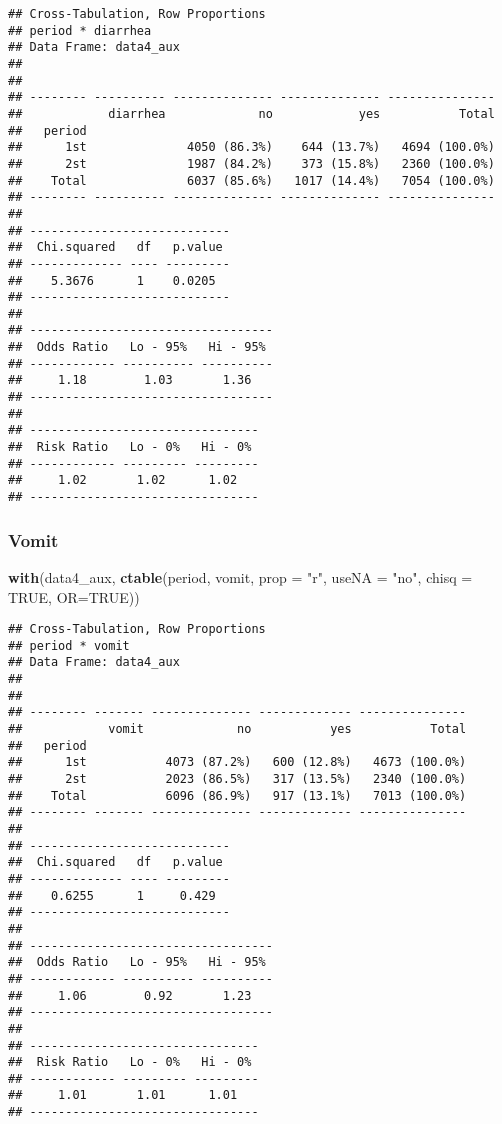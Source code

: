 \documentclass[
]{article}
\newenvironment{Shaded}{\begin{snugshade}}{\end{snugshade}}
\newcommand{\DataTypeTok}[1]{\textcolor[rgb]{0.13,0.29,0.53}{#1}}
\newcommand{\KeywordTok}[1]{\textcolor[rgb]{0.13,0.29,0.53}{\textbf{#1}}}
\newcommand{\NormalTok}[1]{#1}
\newcommand{\OtherTok}[1]{\textcolor[rgb]{0.56,0.35,0.01}{#1}}
\newcommand{\StringTok}[1]{\textcolor[rgb]{0.31,0.60,0.02}{#1}}
\begin{document}
\begin{verbatim}
## Cross-Tabulation, Row Proportions  
## period * diarrhea  
## Data Frame: data4_aux  
## 
## 
## -------- ---------- -------------- -------------- ---------------
##            diarrhea             no            yes           Total
##   period                                                         
##      1st              4050 (86.3%)    644 (13.7%)   4694 (100.0%)
##      2st              1987 (84.2%)    373 (15.8%)   2360 (100.0%)
##    Total              6037 (85.6%)   1017 (14.4%)   7054 (100.0%)
## -------- ---------- -------------- -------------- ---------------
## 
## ----------------------------
##  Chi.squared   df   p.value 
## ------------- ---- ---------
##    5.3676      1    0.0205  
## ----------------------------
## 
## ----------------------------------
##  Odds Ratio   Lo - 95%   Hi - 95% 
## ------------ ---------- ----------
##     1.18        1.03       1.36   
## ----------------------------------
## 
## --------------------------------
##  Risk Ratio   Lo - 0%   Hi - 0% 
## ------------ --------- ---------
##     1.02       1.02      1.02   
## --------------------------------
\end{verbatim}

\hypertarget{vomit-2}{%
\subsubsection{Vomit}\label{vomit-2}}

\begin{Shaded}
\begin{Highlighting}[]
\KeywordTok{with}\NormalTok{(data4_aux, }\KeywordTok{ctable}\NormalTok{(period, vomit, }\DataTypeTok{prop =} \StringTok{"r"}\NormalTok{, }\DataTypeTok{useNA =} \StringTok{"no"}\NormalTok{, }\DataTypeTok{chisq =} \OtherTok{TRUE}\NormalTok{, }\DataTypeTok{OR=}\OtherTok{TRUE}\NormalTok{))}
\end{Highlighting}
\end{Shaded}

\begin{verbatim}
## Cross-Tabulation, Row Proportions  
## period * vomit  
## Data Frame: data4_aux  
## 
## 
## -------- ------- -------------- ------------- ---------------
##            vomit             no           yes           Total
##   period                                                     
##      1st           4073 (87.2%)   600 (12.8%)   4673 (100.0%)
##      2st           2023 (86.5%)   317 (13.5%)   2340 (100.0%)
##    Total           6096 (86.9%)   917 (13.1%)   7013 (100.0%)
## -------- ------- -------------- ------------- ---------------
## 
## ----------------------------
##  Chi.squared   df   p.value 
## ------------- ---- ---------
##    0.6255      1     0.429  
## ----------------------------
## 
## ----------------------------------
##  Odds Ratio   Lo - 95%   Hi - 95% 
## ------------ ---------- ----------
##     1.06        0.92       1.23   
## ----------------------------------
## 
## --------------------------------
##  Risk Ratio   Lo - 0%   Hi - 0% 
## ------------ --------- ---------
##     1.01       1.01      1.01   
## --------------------------------
\end{verbatim}
\end{document}
